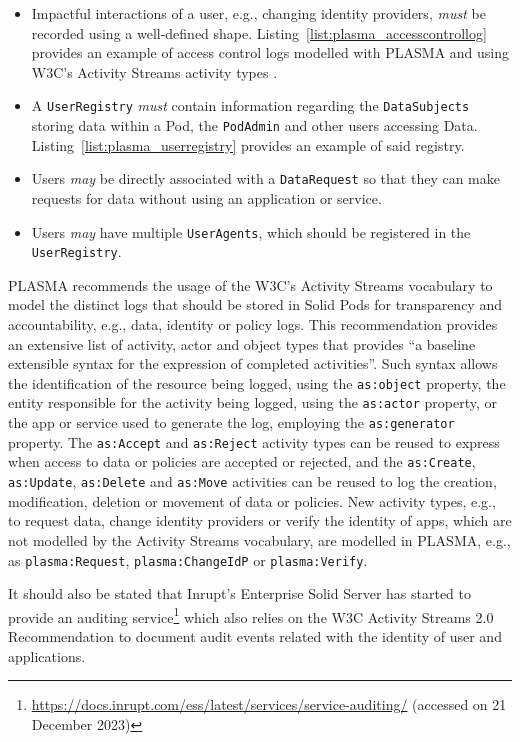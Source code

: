 \begin{itemize}
    \item Impactful interactions of a user, e.g., changing identity providers, \textit{must} be recorded using a well-defined shape. Listing~\ref{list:plasma_accesscontrollog} provides an example of access control logs modelled with PLASMA and using W3C's Activity Streams activity types \citep{snell_activity_2017}.
    \item A \texttt{UserRegistry} \textit{must} contain information regarding the \texttt{DataSubjects} storing data within a Pod, the \texttt{PodAdmin} and other users accessing Data. Listing~\ref{list:plasma_userregistry} provides an example of said registry.
    \item Users \textit{may} be directly associated with a \texttt{DataRequest} so that they can make requests for data without using an application or service.
    \item Users \textit{may} have multiple \texttt{UserAgents}, which should be registered in the \texttt{UserRegistry}.
\end{itemize}

PLASMA recommends the usage of the W3C's Activity Streams vocabulary \citep{snell_activity_2017} to model the distinct logs that should be stored in Solid Pods for transparency and accountability, e.g., data, identity or policy logs.
This recommendation provides an extensive list of activity, actor and object types that provides ``a baseline extensible syntax for the expression of completed activities''.
Such syntax allows the identification of the resource being logged, using the \texttt{as:object} property, the entity responsible for the activity being logged, using the \texttt{as:actor} property, or the app or service used to generate the log, employing the \texttt{as:generator} property.
The \texttt{as:Accept} and \texttt{as:Reject} activity types can be reused to express when access to data or policies are accepted or rejected, and the \texttt{as:Create}, \texttt{as:Update}, \texttt{as:Delete} and \texttt{as:Move} activities can be reused to log the creation, modification, deletion or movement of data or policies.
New activity types, e.g., to request data, change identity providers or verify the identity of apps, which are not modelled by the Activity Streams vocabulary, are modelled in PLASMA, e.g., as \texttt{plasma:Request}, \texttt{plasma:ChangeIdP} or \texttt{plasma:Verify}.

It should also be stated that Inrupt's Enterprise Solid Server has started to provide an auditing service\footnote{\url{https://docs.inrupt.com/ess/latest/services/service-auditing/} (accessed on 21 December 2023)} which also relies on the W3C Activity Streams 2.0 Recommendation \citep{snell_activity_2017} to document audit events related with the identity of user and applications.

